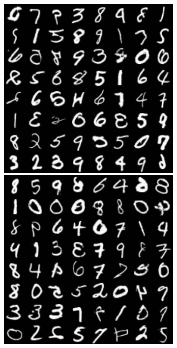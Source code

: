 \begin{figure}[!ht]
  \begin{subfigure}{0.495\textwidth} 
  \includegraphics[width=\linewidth]{figs/imgs/ddpm_glsddpm_mnist_data_samples_T_400_5_steps.jpg} 
    \includegraphics[width=\linewidth]{figs/imgs/ddpm_glsddim_mnist_data_samples_T_500_5_steps.jpg} 

\end{subfigure}
\end{figure}

